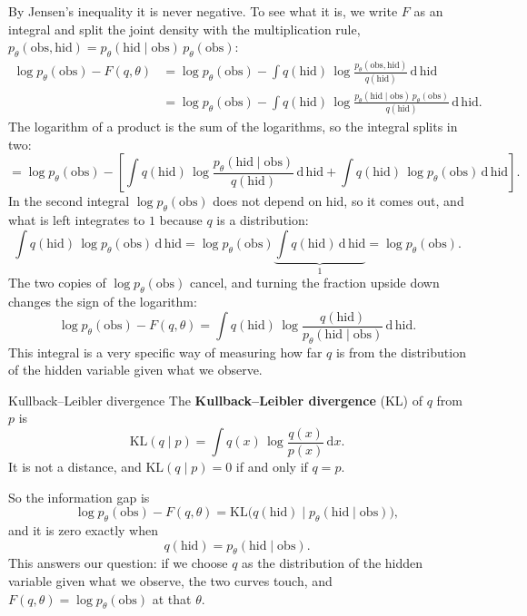 \documentclass[a4paper,12pt,oneside]{report}
\begin{document}
By Jensen's inequality it is never negative. To see what it is, we write
$F$ as an integral and split the joint density with the multiplication
rule, $p_\theta(\text{obs},\text{hid})=p_\theta(\text{hid}\mid\text{obs})\,
p_\theta(\text{obs})$:
\begin{align*}
\log p_\theta(\text{obs})-F(q,\theta)
&=\log p_\theta(\text{obs})-\int q(\text{hid})\,
\log\frac{p_\theta(\text{obs},\text{hid})}{q(\text{hid})}\,\mathrm{d}\,\text{hid}\\
&=\log p_\theta(\text{obs})-\int q(\text{hid})\,
\log\frac{p_\theta(\text{hid}\mid\text{obs})\,p_\theta(\text{obs})}{q(\text{hid})}\,
\mathrm{d}\,\text{hid}.
\end{align*}
The logarithm of a product is the sum of the logarithms, so the integral
splits in two:
\[
=\log p_\theta(\text{obs})-\left[\int q(\text{hid})\,
\log\frac{p_\theta(\text{hid}\mid\text{obs})}{q(\text{hid})}\,\mathrm{d}\,\text{hid}
+\int q(\text{hid})\,\log p_\theta(\text{obs})\,\mathrm{d}\,\text{hid}\right].
\]
In the second integral $\log p_\theta(\text{obs})$ does not depend on
$\text{hid}$, so it comes out, and what is left integrates to $1$ because
$q$ is a distribution:
\[
\int q(\text{hid})\,\log p_\theta(\text{obs})\,\mathrm{d}\,\text{hid}
=\log p_\theta(\text{obs})\underbrace{\int q(\text{hid})\,\mathrm{d}\,\text{hid}}_{1}
=\log p_\theta(\text{obs}).
\]
The two copies of $\log p_\theta(\text{obs})$ cancel, and turning the
fraction upside down changes the sign of the logarithm:
\[
\log p_\theta(\text{obs})-F(q,\theta)
=\int q(\text{hid})\,\log\frac{q(\text{hid})}{p_\theta(\text{hid}\mid\text{obs})}\,
\mathrm{d}\,\text{hid}.
\]
This integral is a very specific way of measuring how far $q$ is from the
distribution of the hidden variable given what we observe.

\begin{frameddefn}{Kullback--Leibler divergence}\label{def:kl}
The \textbf{Kullback--Leibler divergence} (KL) of $q$ from $p$ is
\[
\mathrm{KL}(q\mid p)=\int q(x)\,\log\frac{q(x)}{p(x)}\,\mathrm{d}x.
\]
It is not a distance, and $\mathrm{KL}(q\mid p)=0$ if and only if $q=p$.
\end{frameddefn}

So the information gap is
\[
\log p_\theta(\text{obs})-F(q,\theta)
=\mathrm{KL}\big(q(\text{hid})\mid p_\theta(\text{hid}\mid\text{obs})\big),
\]
and it is zero exactly when
\[
q(\text{hid})=p_\theta(\text{hid}\mid\text{obs}).
\]
This answers our question: if we choose $q$ as the distribution of the
hidden variable given what we observe, the two curves touch, and
$F(q,\theta)=\log p_\theta(\text{obs})$ at that $\theta$.
\end{document}
